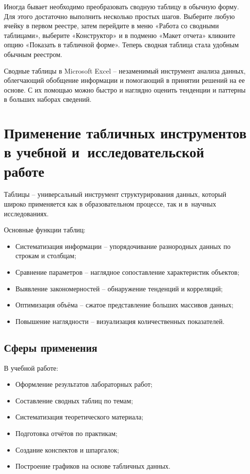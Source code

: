 \documentclass{ou}
\begin{document}
Иногда бывает необходимо преобразовать сводную таблицу в обычную форму. Для этого достаточно выполнить несколько простых шагов. Выберите любую ячейку в первом реестре, затем перейдите в меню «Работа со сводными таблицами», выберите «Конструктор» и в подменю «Макет отчета» кликните опцию «Показать в табличной форме». Теперь сводная таблица стала удобным обычным реестром.

Сводные таблицы в Microsoft Excel -- незаменимый инструмент анализа данных, облегчающий обобщение информации и помогающий в принятии решений на ее основе. С их помощью можно быстро и наглядно оценить тенденции и паттерны в больших наборах сведений.
\newpage
\section{Применение табличных инструментов в учебной и~исследовательской работе}
Таблицы -- универсальный инструмент структурирования данных, который широко применяется как в образовательном процессе, так и в~научных исследованиях.

Основные функции таблиц:
\begin{itemize}[label=-, leftmargin=0em, itemindent=3.35em, nosep]
\item Систематизация информации -- упорядочивание разнородных данных по строкам и столбцам;
\item Сравнение параметров -- наглядное сопоставление характеристик объектов;
\item Выявление закономерностей -- обнаружение тенденций и корреляций;
\item Оптимизация объёма -- сжатое представление больших массивов данных;
\item Повышение наглядности -- визуализация количественных показателей.
\end{itemize}
\subsection{Сферы применения}
В учебной работе:
\begin{itemize}[label=-, leftmargin=0em, itemindent=3.35em, nosep]
\item Оформление результатов лабораторных работ;
\item Составление сводных таблиц по темам;
\item Систематизация теоретического материала;
\item Подготовка отчётов по практикам;
\item Создание конспектов и шпаргалок;
\item Построение графиков на основе табличных данных.
\end{itemize}
\end{document}
